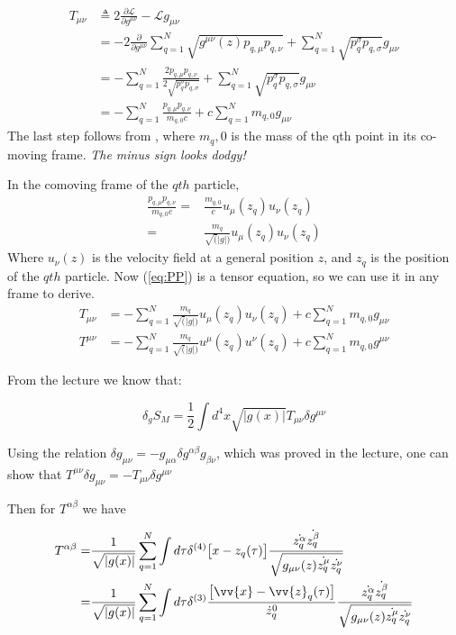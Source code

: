 \documentclass[]{article}
\newcommand{\Lagr}{\mathscr{L}}
\begin{document}
\begin{align}
T_{\mu\nu}&\triangleq 2 \frac{\partial \Lagr}{\partial g^{\mu\nu}} - \Lagr g_{\mu\nu} \label{eq:T}\\
&= -2 \frac{\partial }{\partial g^{\mu\nu}}\sum_{q=1}^N \sqrt{g^{\mu\nu}(z) p_{q,\mu} p_{q,\nu}}+\sum_{q=1}^N \sqrt{ p^{\sigma}_q p_{q,\sigma}} g_{\mu\nu} \\
&= - \sum_{q=1}^N \frac{2 p_{q,\mu} p_{q,\nu}}{2 \sqrt{ p^{\sigma}_q p_{q,\sigma}} }  +\sum_{q=1}^N \sqrt{ p^{\sigma}_q p_{q,\sigma}} g_{\mu\nu} \\
&= - \sum_{q=1}^N \frac{p_{q,\mu} p_{q,\nu}}{ m_{q,0} c }  +c\sum_{q=1}^N   m_{q,0} g_{\mu\nu} 
\end{align}
The last step follows from \cite{wiki_momentum}, where $m_q,0$ is the mass of the qth point in its co-moving frame. \emph{The minus sign looks dodgy!}


In the comoving frame of the $qth$ particle,
\begin{align}
\frac{p_{q,\mu} p_{q,\nu}}{ m_{q,0} c } =& \frac{m_{q,0}}{c}  u_{\mu}(z_q) u_{\nu}(z_q)\\
=& \frac{m_{q}}{\sqrt(|g|)}  u_{\mu}(z_q) u_{\nu}(z_q) \label{eq:PP}
\end{align}
Where $u_{\nu}(z)$ is the velocity field at a general position $z$, and $z_q$ is the position of the $qth$ particle. Now (\ref{eq:PP}) is a tensor equation, so we can use it in any frame to derive.
\begin{align}
T_{\mu\nu} &= - \sum_{q=1}^N  \frac{m_{q}}{\sqrt(|g|)}  u_{\mu}(z_q) u_{\nu}(z_q)  +c\sum_{q=1}^N   m_{q,0} g_{\mu\nu}\\
T^{\mu\nu} &= - \sum_{q=1}^N  \frac{m_{q}}{\sqrt(|g|)}  u^{\mu}(z_q) u^{\nu}(z_q)  +c\sum_{q=1}^N   m_{q,0} g^{\mu\nu}
\end{align}

From the lecture we know that:

$$\delta_g S_M = \frac{1}{2} \int d^4 x \sqrt{|g(x)|} T_{\mu\nu} \delta g^{\mu\nu}$$


Using the relation $\delta g_{\mu\nu} = − g_{\mu\alpha} \delta g ^{\alpha\beta} g_{\beta\nu}$, which was proved in the lecture, one can show that $T^{\mu\nu} \delta g_{\mu\nu} = - T_{\mu\nu} \delta g^{\mu\nu}$

Then for $T^{\alpha\beta}$ we have

\begin{align*}
T^{\alpha\beta} =& \frac{1}{\sqrt{|g(x)|}} \sum_{q=1}^{N} \int d\tau \delta^{(4)} \big[x-z_q(\tau)\big]\frac{\dot{z_q^\alpha} \dot{z_q^\beta}}{\sqrt{g_{\mu\nu}(z)\dot{z_q^\mu}\dot{z_q^\nu}}} \\
=& \frac{1}{\sqrt{|g(x)|}} \sum_{q=1}^{N} \int d\tau \delta^{(3)} \frac{\big[\vv{x}-\vv{z}_q(\tau)\big]}{\dot{z}_q^0}\frac{\dot{z_q^\alpha}  \dot{z_q^\beta}}{\sqrt{g_{\mu\nu}(z)\dot{z_q^\mu}\dot{z_q^\nu}}}
\end{align*}
\end{document}
